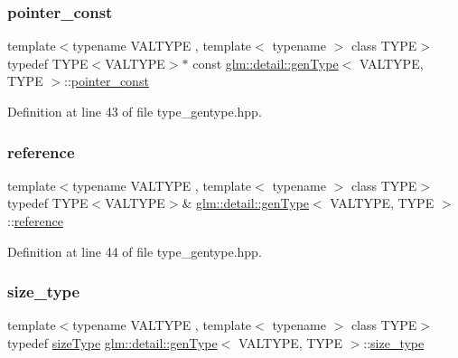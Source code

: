 \subsubsection{\texorpdfstring{pointer\_const}{pointer\_const}}
{\footnotesize\ttfamily template$<$typename V\+A\+L\+T\+Y\+PE , template$<$ typename $>$ class T\+Y\+PE$>$ \\
typedef T\+Y\+PE$<$V\+A\+L\+T\+Y\+PE$>$$\ast$ const \mbox{\hyperlink{structglm_1_1detail_1_1gen_type}{glm\+::detail\+::gen\+Type}}$<$ V\+A\+L\+T\+Y\+PE, T\+Y\+PE $>$\+::\mbox{\hyperlink{structglm_1_1detail_1_1gen_type_a4d7745054035d7efed18ec1d7215bbf0}{pointer\+\_\+const}}}



Definition at line 43 of file type\+\_\+gentype.\+hpp.

\mbox{\label{structglm_1_1detail_1_1gen_type_a14792cf03ce9cfb37becd2da5d9ae06a}} 
\subsubsection{\texorpdfstring{reference}{reference}}
{\footnotesize\ttfamily template$<$typename V\+A\+L\+T\+Y\+PE , template$<$ typename $>$ class T\+Y\+PE$>$ \\
typedef T\+Y\+PE$<$V\+A\+L\+T\+Y\+PE$>$\& \mbox{\hyperlink{structglm_1_1detail_1_1gen_type}{glm\+::detail\+::gen\+Type}}$<$ V\+A\+L\+T\+Y\+PE, T\+Y\+PE $>$\+::\mbox{\hyperlink{structglm_1_1detail_1_1gen_type_a14792cf03ce9cfb37becd2da5d9ae06a}{reference}}}



Definition at line 44 of file type\+\_\+gentype.\+hpp.

\mbox{\label{structglm_1_1detail_1_1gen_type_af4fa06eb65eebb96960fae19a3b439eb}} 
\subsubsection{\texorpdfstring{size\_type}{size\_type}}
{\footnotesize\ttfamily template$<$typename V\+A\+L\+T\+Y\+PE , template$<$ typename $>$ class T\+Y\+PE$>$ \\
typedef \mbox{\hyperlink{namespaceglm_ae49d80f7bfe4be96585fe8f1d3431cc6}{size\+Type}} \mbox{\hyperlink{structglm_1_1detail_1_1gen_type}{glm\+::detail\+::gen\+Type}}$<$ V\+A\+L\+T\+Y\+PE, T\+Y\+PE $>$\+::\mbox{\hyperlink{structglm_1_1detail_1_1gen_type_af4fa06eb65eebb96960fae19a3b439eb}{size\+\_\+type}}}



